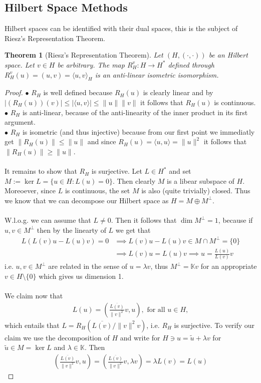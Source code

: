 \documentclass[11pt,a4paper]{article}
\newtheorem{thm}{Theorem}[section]
\theoremstyle{definition}
\begin{document}
\subsection{Hilbert Space Methods}
Hilbert spaces can be identified with their dual spaces, this is the subject of Riesz's Representation Theorem. 
\begin{thm}[Riesz's Representation Theorem] Let $(H,( \cdot , \cdot))$ be an Hilbert space. Let $v \in H$ be arbitrary. The map $R_H^v : H \to H^*$ defined through $R_H^v(u)=(u,v)=\langle u,v\rangle_{H}$ is an anti-linear isometric isomorphism. 
\end{thm}
\begin{proof}
$\bullet$ $R_H$ is well defined because $R_H(u)$ is clearly linear and by $|(R_H(u))(v)| \leq | \langle u,v \rangle | \leq \|u \| \|v\|$ it follows that $R_H(u)$ is continuous. \\
$\bullet$ $R_H$ is anti-linear, because of the anti-linearity of the inner product in its first argument. \\
$\bullet$ $R_H$ is isometric (and thus injective) because from our first point we immediatly get $\|R_H(u)\| \leq \|u\|$ and since $R_H(u)= \langle u,u \rangle = \|u\|^2$ it follows that $\|R_H(u)\| \geq \|u\|$.
\\\\
It remains to show that $R_H$ is surjective. Let $L \in H^*$ and set $M :=\ker L = \lbrace u \in H : L(u)=0 \rbrace$. Then clearly $M$ is a libear subspace of $H$. Moreoever, since $L$ is continuous, the set $M$ is also (quite trivially) closed. Thus we know that we can decompose our Hilbert space as $H= M \oplus M^\perp$. \\\\
W.l.o.g. we can assume that $L \neq 0$. Then it follows that $\dim M^\perp = 1$, because if $u,v \in M^\perp$ then by the linearty of $L$ we get that
\begin{align*}
L(L(v)u-L(u)v)=0 &\implies L(v)u-L(u)v \in M \cap M^\perp = \lbrace 0 \rbrace \\ 
&\implies L(v)u=L(u)v \implies u= \frac{L(u)}{L(v)}v
\end{align*} 
i.e. $u,v \in M^\perp$ are related in the sense of $u = \lambda v$, thus $M^\perp = \mathbb{K}v$ for an appropriate $v \in H \setminus \lbrace 0 \rbrace$ which gives us dimension 1. \\
\\
We claim now that 
\begin{align*}
L(u)= \left( \frac{\overline{L(v)}}{\|v\|^2}v,u \right), \text{ for all } u \in H,
\end{align*}
which entails that $L = R_H( \overline{L(v)}/\|v\|^2 v)$, i.e. $R_H$ is surjective. To verify our claim we use the decomposition of $H$ and write for $H \ni u = \tilde{u} + \lambda v$ for $\tilde{u} \in M = \ker L$ and $\lambda \in \mathbb{K}$. Then 
\begin{align*}
\left( \frac{\overline{L(v)}}{\|v\|^2}v,u \right) = \left( \frac{\overline{L(v)}}{\|v\|^2}v, \lambda v \right) = \lambda L(v)= L(u)
\end{align*}
\end{proof}
\end{document}
